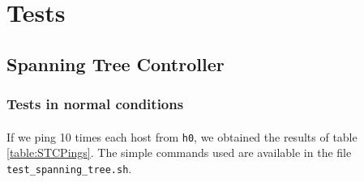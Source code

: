 \documentclass[a4paper, 11pt, oneside]{article}
\begin{document}

\section{Tests}

\subsection{Spanning Tree Controller}
\subsubsection{Tests in normal conditions}
\paragraph{}If we ping 10 times each host from \texttt{h0}, we obtained the results of table \ref{table:STCPings}. The simple commands used are available in the file \texttt{test\_spanning\_tree.sh}.\\
\end{document}
